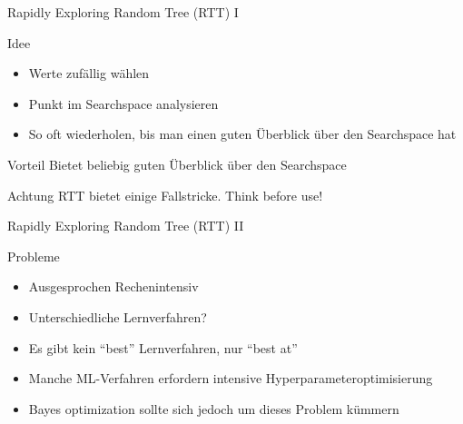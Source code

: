 \documentclass{beamer}
\begin{document}
	\begin{frame}{Rapidly Exploring Random Tree (RTT) I}
		\begin{alertblock}{Idee}
			\begin{itemize}
				\item Werte zufällig wählen
				\item Punkt im Searchspace analysieren
				\item So oft wiederholen, bis man einen guten Überblick über den Searchspace hat
			\end{itemize}
		\end{alertblock}
		\pause
		\begin{alertblock}{Vorteil}
			Bietet beliebig guten Überblick über den Searchspace
		\end{alertblock}
		\pause
		\begin{alertblock}{Achtung}
			RTT bietet einige Fallstricke. Think before use!
		\end{alertblock}
	\end{frame}
	
	\begin{frame}{Rapidly Exploring Random Tree (RTT) II}
		\centering
	\end{frame}
	
	\begin{frame}{Probleme}
		\begin{itemize}
			\item Ausgesprochen Rechenintensiv
			\item Unterschiedliche Lernverfahren?
			\item Es gibt kein ``best'' Lernverfahren, nur ``best at''
			\item Manche ML-Verfahren erfordern intensive Hyperparameteroptimisierung
			\item Bayes optimization sollte sich jedoch um dieses Problem kümmern
		\end{itemize}
	\end{frame}
	
\end{document}
